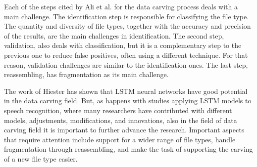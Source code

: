
Each of the steps cited by Ali et al. \cite{ali_review_2018} for the data carving process deals with a main challenge. The identification step is responsible for classifying the file type. The quantity and diversity of file types, together with the accuracy and precision of the results, are the main challenges in identification. The second step, validation, also deals with classification, but it is a complementary step to the previous one to reduce false positives, often using a different technique. For that reason, validation challenges are similar to the identification ones. The last step, reassembling, has fragmentation as its main challenge.

The work of Hiester \cite{hiester_file_2018} has shown that LSTM neural networks have good potential in the data carving field. But, as happens with studies applying LSTM models to speech recognition, where many researchers have contributed with different models, adjustments, modifications, and innovations, also in the field of data carving field it is important to further advance the research. Important aspects that require attention include support for a wider range of file types, handle fragmentation through reassembling, and make the task of supporting the carving of a new file type easier.





